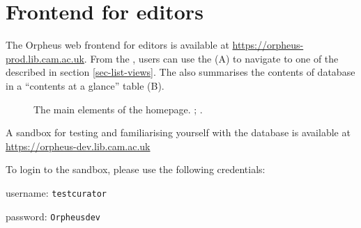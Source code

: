 \documentclass[british, 12pt]{article}
\begin{document}
\section{Frontend for editors}

The Orpheus web frontend for editors is available at \url{https://orpheus-prod.lib.cam.ac.uk}. From the , users can use the  (\figp{\ref{fig-home}}A) to navigate to one of the  described in section \vref{sec-list-views}. The  also summarises the contents of database in a ``contents at a glance'' table (\figp{\ref{fig-home}}B).

\begin{figure}
  \caption{The main elements of the homepage. ; .}
  \label{fig-home}
\end{figure}

\begin{tip}[Sandbox]
  A sandbox for testing and familiarising yourself with the database is available at \url{https://orpheus-dev.lib.cam.ac.uk}
  \vspace{1em}

  To login to the sandbox, please use the following credentials:

  username: \texttt{test\textunderscore curator}

  password: \texttt{Orpheus\textunderscore dev}
\end{tip}
\end{document}
